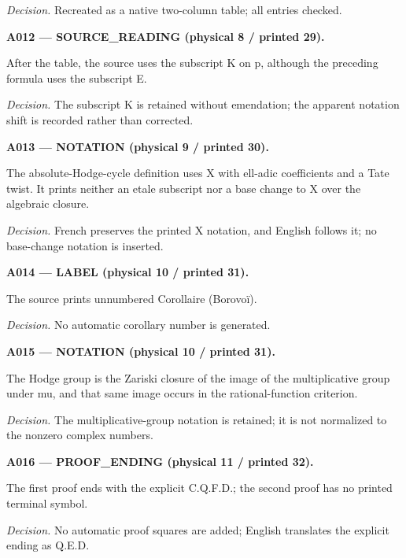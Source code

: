\documentclass[10pt,a4paper]{article}
\begin{document}
\par\textit{Decision.} Recreated as a native two-column table; all entries checked.

\medskip

\noindent\textbf{A012 --- SOURCE\_READING (physical 8 / printed 29).}

After the table, the source uses the subscript K on p, although the preceding formula uses the subscript E.

\par\textit{Decision.} The subscript K is retained without emendation; the apparent notation shift is recorded rather than corrected.

\medskip

\noindent\textbf{A013 --- NOTATION (physical 9 / printed 30).}

The absolute-Hodge-cycle definition uses X with ell-adic coefficients and a Tate twist. It prints neither an etale subscript nor a base change to X over the algebraic closure.

\par\textit{Decision.} French preserves the printed X notation, and English follows it; no base-change notation is inserted.

\medskip

\noindent\textbf{A014 --- LABEL (physical 10 / printed 31).}

The source prints unnumbered Corollaire (Borovoï).

\par\textit{Decision.} No automatic corollary number is generated.

\medskip

\noindent\textbf{A015 --- NOTATION (physical 10 / printed 31).}

The Hodge group is the Zariski closure of the image of the multiplicative group under mu, and that same image occurs in the rational-function criterion.

\par\textit{Decision.} The multiplicative-group notation is retained; it is not normalized to the nonzero complex numbers.

\medskip

\noindent\textbf{A016 --- PROOF\_ENDING (physical 11 / printed 32).}

The first proof ends with the explicit C.Q.F.D.; the second proof has no printed terminal symbol.

\par\textit{Decision.} No automatic proof squares are added; English translates the explicit ending as Q.E.D.
\end{document}
